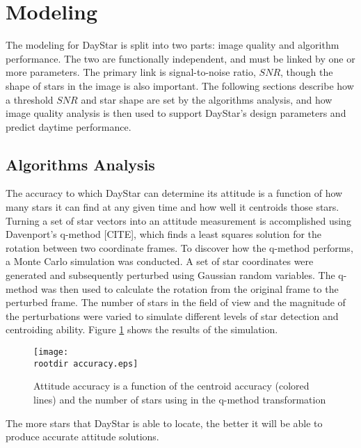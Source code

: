 \documentclass[twocolumn,letterpaper]{IEEEAerospace2012}
\newcommand{\rootdir}{./Figures/}
\newcommand{\SNR}{\mathit{SNR}}
\begin{document}
\section{Modeling}
The modeling for DayStar is split into two parts: image quality and algorithm performance. The two are functionally independent, and must be linked by one or more parameters. The primary link is signal-to-noise ratio, $\SNR$, though the shape of stars in the image is also important. The following sections describe how a threshold $\SNR$ and star shape are set by the algorithms analysis, and how image quality analysis is then used to support DayStar's design parameters and predict daytime performance.

\subsection{Algorithms Analysis}
The accuracy to which DayStar can determine its attitude is a function of how many stars it can find at any given time and how well it centroids those stars. Turning a set of star vectors into an attitude measurement is accomplished using Davenport's q-method [CITE], which finds a least squares solution for the rotation between two coordinate frames. To discover how the q-method performs, a Monte Carlo simulation was conducted. A set of star coordinates were generated and subsequently perturbed using Gaussian random variables. The q-method was then used to calculate the rotation from the original frame to the perturbed frame. The number of stars in the field of view and the magnitude of the perturbations were varied to simulate different levels of star detection and centroiding ability. Figure \ref{fig:accuracy} shows the results of the simulation.
\begin{figure}[H]
    \label{fig:accuracy}
    \texttt{[image: \\rootdir accuracy.eps]}
    \caption{Attitude accuracy is a function of the centroid accuracy (colored lines) and the number of stars using in the q-method transformation}
\end{figure}
The more stars that DayStar is able to locate, the better it will be able to produce accurate attitude solutions.
\end{document}
